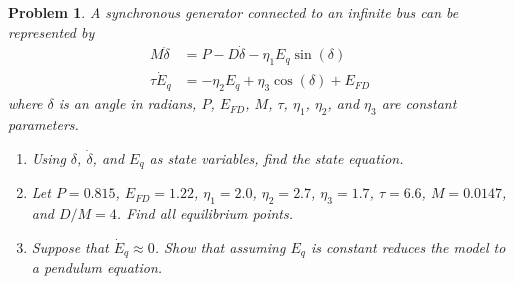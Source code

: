 \documentclass[12pt]{exam}
\theoremstyle{mytheoremstyle}
\newtheorem{problem}{Problem}
\begin{document}
\newpage
\begin{problem}
A synchronous generator connected to an infinite bus can be represented by
\begin{align*}
    M \ddot{\delta} &= P - D \dot{\delta} - \eta_1 E_q \sin(\delta)\\
    \tau \dot{E}_q &= - \eta_2 E_q + \eta_3 \cos(\delta) + E_{FD}
\end{align*}
where $\delta$ is an angle in radians, $P$, $E_{FD}$, $M$, $\tau$, $\eta_1$, $\eta_2$, and $\eta_3$ are constant parameters. 
\begin{enumerate}[label=(P\arabic*)]
    \item Using $\delta$, $\dot{\delta}$, and $E_q$ as state variables, find the state equation. 
    \item Let $P = 0.815$, $E_{FD} = 1.22$, $\eta_1 = 2.0$, $\eta_2 = 2.7$, $\eta_3 = 1.7$, $\tau = 6.6$, $M = 0.0147$, and $D/M = 4$. Find all equilibrium points. 
    \item Suppose that $\dot{E}_q \approx 0$. Show that assuming $E_q$ is constant reduces the model to a pendulum equation. 
\end{enumerate}
\end{problem}
\end{document}
